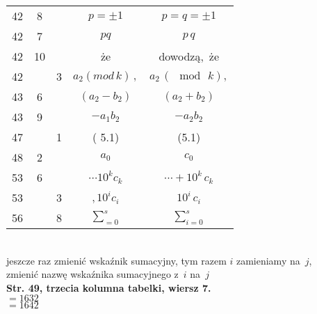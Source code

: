 \documentclass[a4paper,11pt]{article}
\begin{document}
\begin{center}
\begin{tabular}{|c|c|c|c|c|}
    42  &  8 & & $p = \pm 1$ & $p = q = \pm 1$ \\
    42  &  7 & & $pq$ & $p \, q$ \\
    42  & 10 & & że & dowodzą,~że \\
    42  & &  3 & $a_{ 2 } ( mod \, k ) \, ,$ & $a_{ 2 } \, ( \mod \, k ),$ \\
    43  &  6 & & $( a_{ 2 } - b_{ 2 } )$ & $( a_{ 2 } + b_{ 2 } )$ \\
    43  &  9 & & $- a_{ 1 } b_{ 2 }$ & $- a_{ 2 } b_{ 2 }$ \\
    47  & &  1 & ( 5.1) & (5.1) \\
    48  &  2 & & $a_{ 0 }$ & $c_{ 0 }$ \\
    53  &  6 & & $\cdots 10^{ k } c_{ k }$ & $\cdots + 10^{ k } \, c_{ k }$ \\
    53  & &  3 & $, 10^{ i } c_{ i }$ & $10^{ i } \, c_{ i }$ \\
    56  & &  8 & $\displaystyle \sum_{ = 0 }^{ s }$
      & $\displaystyle \sum_{ i = 0 }^{ s }$ \\
    \hline
  \end{tabular}

\end{center}

\vspace{\spaceTwo}


 \\
\Jest  jeszcze raz zmienić wskaźnik sumacyjny, tym razem $i$ zamieniamy
na~$j$, \\
\Powin zmienić nazwę wskaźnika sumacyjnego z~$i$ na~$j$ \\
\textbf{Str. 49, trzecia kolumna tabelki, wiersz 7.} \\
\Jest  $= 1632$ \\
\Powin $= 1642$ \\













{}






\end{document}

